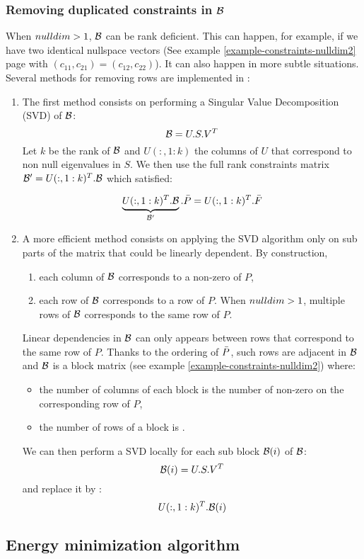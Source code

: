 \subsubsection{Removing duplicated constraints in $\mathcal{B}$}

When $nulldim > 1$, $\mathcal{B}$ can be rank deficient. This can happen, for example, if we have two identical
nullspace vectors (See example \ref{example-constraints-nulldim2} page \pageref{example-constraints-nulldim2} with $(c_{11}, c_{21}) = (c_{12}, c_{22})$). 
It can also happen in more subtle situations. Several methods for removing rows are implemented in \muemat:

\begin{enumerate}
\item The first method consists on performing a Singular Value Decomposition (SVD) of $\mathcal{B}$:
$$\mathcal{B} = U.S.V^T$$
Let $k$ be the rank of $\mathcal{B}$ and $U(:,1:k)$ the columns of $U$ that correspond to non null eigenvalues in $S$.
We then use the full rank constraints matrix $\mathcal{B}' = U(:,1:k)^T . \mathcal{B}$ which satisfied:

$$\underbrace{U(:,1:k)^T . \mathcal{B}}_{\mathcal{B}'} . \bar{P} = U(:,1:k)^T . \bar{F}$$

\item A more efficient method consists on applying the SVD algorithm only on sub parts of the matrix that could be linearly dependent.
By construction, 
\begin{enumerate}
\item each column of $\mathcal{B}$ corresponds to a non-zero of $P$,
\item each row of $\mathcal{B}$ corresponds to a row of $P$. When $nulldim > 1$, multiple rows of $\mathcal{B}$ corresponds to the same row of $P$.
\end{enumerate}
%
Linear dependencies in $\mathcal{B}$ can only appears between rows that correspond to the same row of $P$.
Thanks to the ordering of $\bar{P}$, such rows are adjacent in $\mathcal{B}$ and $\mathcal{B}$ is a block matrix (see example \ref{example-constraints-nulldim2}) where:
\begin{itemize}
\item the number of columns of each block is the number of non-zero on the corresponding row of $P$,
\item the number of rows of a block is \nulldim.
\end{itemize}

We can then perform a SVD locally for each sub block $\mathcal{B}(i)$ of $\mathcal{B}$:
$$\mathcal{B}(i) = U.S.V^T$$
and replace it by :
$$U(:,1:k)^T.\mathcal{B}(i)$$

\end{enumerate}


\subsection{Energy minimization algorithm}


